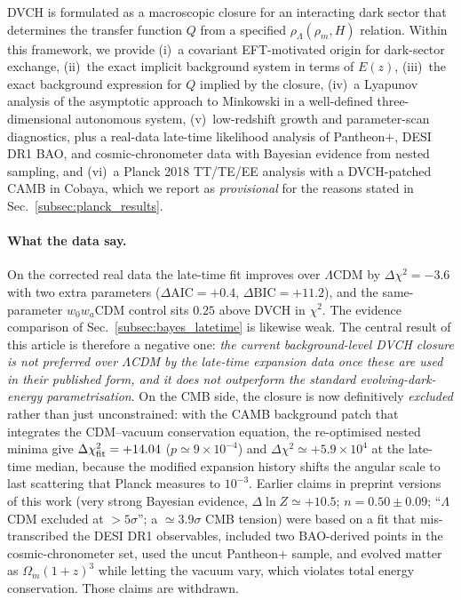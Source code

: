 \documentclass[pdflatex,sn-mathphys-num]{sn-jnl}%
\begin{document}
DVCH is formulated as a macroscopic closure for an interacting dark sector that
determines the transfer function $Q$ from a specified
$\rho_\Lambda(\rho_m,H)$ relation. Within this framework, we provide
(i)~a covariant EFT-motivated origin for dark-sector exchange,
(ii)~the exact implicit background system in terms of $E(z)$,
(iii)~the exact background expression for $Q$ implied by the closure,
(iv)~a Lyapunov analysis of the asymptotic approach to Minkowski in a
well-defined three-dimensional autonomous system,
(v)~low-redshift growth and parameter-scan diagnostics, plus a real-data
late-time likelihood analysis of Pantheon$+$, DESI DR1 BAO, and
cosmic-chronometer data with Bayesian evidence from nested sampling, and
(vi)~a Planck 2018 TT/TE/EE analysis with a DVCH-patched CAMB in
Cobaya, which we report as \emph{provisional} for the reasons stated in
Sec.~\ref{subsec:planck_results}.

\paragraph*{What the data say.}\quad On the corrected real data the
late-time fit improves over $\Lambda$CDM by $\Delta\chi^2=-3.6$ with two
extra parameters ($\Delta\mathrm{AIC}=+0.4$, $\Delta\mathrm{BIC}=+11.2$),
and the same-parameter $w_0w_a$CDM control sits $0.25$ above DVCH in
$\chi^2$. The evidence comparison of Sec.~\ref{subsec:bayes_latetime} is
likewise weak. The central result of this article is therefore a negative
one: \emph{the current background-level DVCH closure is not preferred over
$\Lambda$CDM by the late-time expansion data once these are used in their
published form, and it does not outperform the standard evolving-dark-energy
parametrisation}. On the CMB side, the closure is now definitively
\emph{excluded} rather than just unconstrained: with the CAMB background
patch that integrates the CDM--vacuum conservation equation, the
re-optimised nested minima give $\Delta\chi^2_{\rm fit}=+14.04$
($p\simeq9\times10^{-4}$) and $\Delta\chi^2\simeq+5.9\times10^4$ at the
late-time median, because the modified expansion history shifts the
angular scale to last scattering that Planck measures to $10^{-3}$.
Earlier claims in preprint versions of this work (very
strong Bayesian evidence, $\Delta\ln Z\simeq+10.5$; $n=0.50\pm0.09$;
``$\Lambda$CDM excluded at $>5\sigma$''; a $\simeq3.9\sigma$ CMB tension)
were based on a fit that mis-transcribed the DESI DR1 observables, included
two BAO-derived points in the cosmic-chronometer set, used the uncut
Pantheon$+$ sample, and evolved matter as $\Omega_m(1+z)^3$ while letting
the vacuum vary, which violates total energy conservation. Those claims are
withdrawn.
\end{document}
